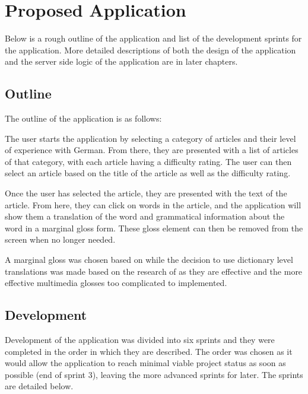 \chapter{Proposed Application}

Below is a rough outline of the application and list of the development sprints for the application. More detailed descriptions of both the design of the application and the server side logic of the application are in later chapters. 

\section{Outline}

The outline of the application is as follows: 

The user starts the application by selecting a category of articles and their level of experience with German. From there, they are presented with a list of articles of that category, with each article having a difficulty rating. The user can then select an article based on the title of the article as well as the difficulty rating.

Once the user has selected the article, they are presented with the text of the article. From here, they can click on words in the article, and the application will show them a translation of the word and grammatical information about the word in a marginal gloss form. These gloss element can then be removed from the screen when no longer needed.

A marginal gloss was chosen based on \textcite{abuseileek2008} while the decision to use dictionary level translations was made based on the research of \textcite{gettys2001} as they are effective and the more effective multimedia glosses too complicated to implemented.

\section{Development}

Development of the application was divided into six sprints and they were completed in the order in which they are described. The order was chosen as it would allow the application to reach minimal viable project status as soon as possible (end of sprint 3), leaving the more advanced sprints for later. The sprints are detailed below.

